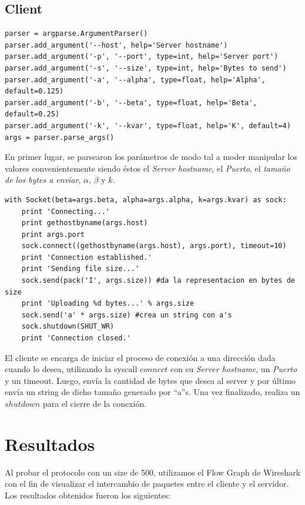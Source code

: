 \documentclass[10pt, a4paper]{article}
\begin{document}
\subsection{Client}
\begin{verbatim}
parser = argparse.ArgumentParser()
parser.add_argument('--host', help='Server hostname')
parser.add_argument('-p', '--port', type=int, help='Server port')
parser.add_argument('-s', '--size', type=int, help='Bytes to send')
parser.add_argument('-a', '--alpha', type=float, help='Alpha', default=0.125)
parser.add_argument('-b', '--beta', type=float, help='Beta', default=0.25)
parser.add_argument('-k', '--kvar', type=float, help='K', default=4)
args = parser.parse_args()
\end{verbatim}

En primer lugar, se parsearon los parámetros de modo tal a moder manipular los valores convenientemente siendo éstos el \textit{Server hostname}, el \textit{Puerto}, el \textit{tamaño de los bytes a enviar}, $\alpha$, $\beta$ y $k$.

\begin{verbatim}
with Socket(beta=args.beta, alpha=args.alpha, k=args.kvar) as sock:
    print 'Connecting...'
    print gethostbyname(args.host)
    print args.port
    sock.connect((gethostbyname(args.host), args.port), timeout=10)
    print 'Connection established.'
    print 'Sending file size...'
    sock.send(pack('I', args.size)) #da la representacion en bytes de size
    print 'Uploading %d bytes...' % args.size
    sock.send('a' * args.size) #crea un string con a's
    sock.shutdown(SHUT_WR)
	print 'Connection closed.'
\end{verbatim}

El cliente se encarga de iniciar el proceso de conexión a una dirección dada cuando lo desea, utilizando la syscall $connect$ con su \textit{Server hostname}, un \textit{Puerto} y un timeout. Luego, envía la cantidad de bytes que desea al server y por último envía un string de dicho tamaño generado por ``a''s. Una vez finalizado, realiza un $shutdown$ para el cierre de la conexión.

\section{Resultados}

Al probar el protocolo con un size de 500, utilizamos el Flow Graph de Wireshark con el fin de visualizar el intercambio de paquetes entre el cliente y el servidor. Los resultados obtenidos fueron los siguientes:
\end{document}
